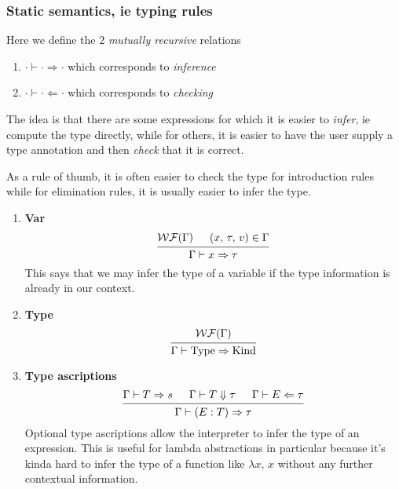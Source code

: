 \documentclass{article}
\begin{document}
\subsubsection{Static semantics, ie typing rules}
\begin{definition} 
  Here we define the 2 \textit{mutually recursive} relations
  \begin{enumerate}
  \item$\cdot \vdash \cdot \Rightarrow \cdot $ which corresponds to \textit{inference}
  \item$\cdot \vdash \cdot \Leftarrow \cdot$ which corresponds to \textit{checking}
  \end{enumerate}

  The idea is that there are some expressions for which it is easier to
  \textit{infer},
  ie compute the type directly, while for others, it is easier to have the user
  supply a type annotation and then \textit{check} that it is correct.

  As a rule of thumb, it is often easier to check the type for
  introduction rules while for elimination rules, it is usually easier to infer
  the type.

  \begin{enumerate}
  \item \textbf{Var} \\
    \[
      \begin{prooftree}
        \hypo{\wf(\Gamma)}
        \hypo{(x, \, \tau, \, v) \in \Gamma}
        \infer2{\Gamma \vdash x \Rightarrow \tau}
      \end{prooftree}
    \]
    This says that we may infer the type of a variable if the type information
    is already in our context.

  \item \textbf{Type} \\
    \[
      \begin{prooftree}
        \hypo{\wf(\Gamma)}
        \infer1{\Gamma \vdash \Type \Rightarrow \Kind}
      \end{prooftree}
    \]


  \item \textbf{Type ascriptions} \\
    \[
      \begin{prooftree}
        \hypo{\Gamma \vdash T \Rightarrow s}
        \hypo{\Gamma \vdash T \Downarrow \tau}
        \hypo{\Gamma \vdash E \Leftarrow \tau}
        \infer3{\Gamma \vdash (E : T) \Rightarrow \tau}
      \end{prooftree}
    \]
    Optional type ascriptions allow the interpreter to infer the type of an
    expression. This is useful for lambda abstractions in particular because it's
    kinda hard to infer the type of a function like $\lambda x, \, x$ without any
    further contextual information.


\end{enumerate}
\end{definition}
\end{document}
